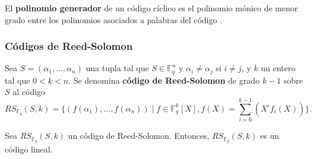 \begin{definition}
	El \textbf{polinomio generador} de un código cíclico es el polinomio mónico de menor grado entre los polinomios asociados a palabras del código \autocite{VERLINDE2003203}.
\end{definition}

\subsubsection{Códigos de Reed-Solomon}

\begin{definition}
	Sea $S = (\alpha_1, \dots, \alpha_n)$ una tupla tal que $S \in \mathbb{F}_q^n$ y $\alpha_i \neq \alpha_j$ si $i \neq j$, y $k$ un entero tal que $0 < k < n$. Se denomina \textbf{código de Reed-Solomon} de grado $k-1$ sobre $S$ al código
	\[RS_{\mathbb{F}_q}(S, k) = \big\{(f(\alpha_1), \dots, f(\alpha_n)) \mid f \in \mathbb{F}_q^k[X], f(X) = \sum_{i=0}^{k-1}(X^i f_i(X)) \big\}.\]
	\autocite{Venkatesan}
\end{definition}

\begin{theorem}
	Sea $RS_{\mathbb{F}_q}(S, k)$ un código de Reed-Solomon. Entonces, $RS_{\mathbb{F}_q}(S, k)$ es un código lineal.
\end{theorem}

